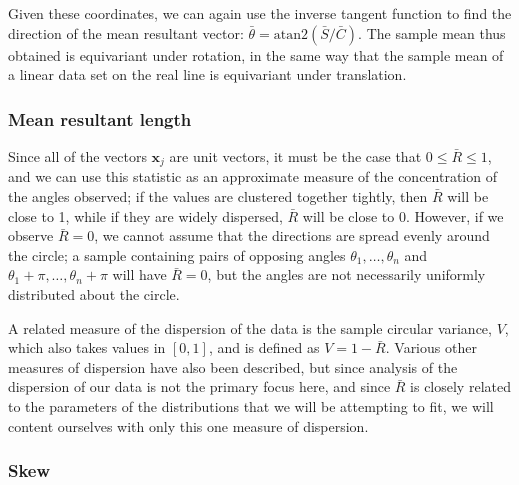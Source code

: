 \documentclass[../../ArchStats.tex]{subfiles}
\begin{document}
Given these coordinates, we can again use the inverse tangent function to find the direction of the mean resultant vector: $\bar{\theta} = \text{atan2}(\bar{S}/\bar{C})$. The sample mean thus obtained is equivariant under rotation, in the same way that the sample mean of a linear data set on the real line is equivariant under translation.


\subsubsection{Mean resultant length}
Since all of the vectors $\mathbf{x}_j$ are unit vectors, it must be the case that $0 \leq \bar{R} \leq 1$, and we can use this statistic as an approximate measure of the concentration of the angles observed; if the values are clustered together tightly, then $\bar{R}$ will be close to 1, while if they are widely dispersed, $\bar{R}$ will be close to 0. However, if we observe $\bar{R} = 0$, we cannot assume that the directions are spread evenly around the circle; a sample containing pairs of opposing angles $\theta_1, \dots, \theta_n$ and $\theta_1+\pi, \dots, \theta_n+\pi$ will have $\bar{R} = 0$, but the angles are not necessarily uniformly distributed about the circle. 

A related measure of the dispersion of the data is the sample circular variance, $V$, which also takes values in $[0,1]$, and is defined as $V = 1-\bar{R}$. Various other measures of dispersion have also been described, but since analysis of the dispersion of our data is not the primary focus here, and since $\bar{R}$ is closely related to the parameters of the distributions that we will be attempting to fit, we will content ourselves with only this one measure of dispersion.


\subsubsection{Skew}


\end{document}
